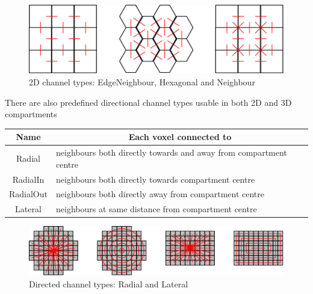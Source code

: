 \medskip 

\begin{figure}[h!]
 \centering
 \includegraphics[scale=0.2]{./images/channelTypes.png}
 \caption{2D channel types: EdgeNeighbour, Hexagonal and Neighbour}
 \label{fig:channelTypes}
\end{figure}

There are also predefined directional channel types usable in both 2D and 3D compartments



\medskip 

\begin{tabular}{|c|l|}
\hline
Name & \multicolumn{1}{|c|}{Each voxel connected to}\\ 
\hline
Radial & neighbours both directly towards and away from compartment centre  \\
RadialIn & neighbours both directly towards compartment centre \\
RadialOut & neighbours both directly away from compartment centre \\
Lateral & neighbours at same distance from compartment centre \\
\hline
\end{tabular} 

\medskip 

\begin{figure}[h!]
 \centering
 \includegraphics[scale=0.2]{./images/directedChannelTypes.png}
 \caption{Directed channel types: Radial and Lateral}
 \label{fig:directedChannelTypes}
\end{figure}

